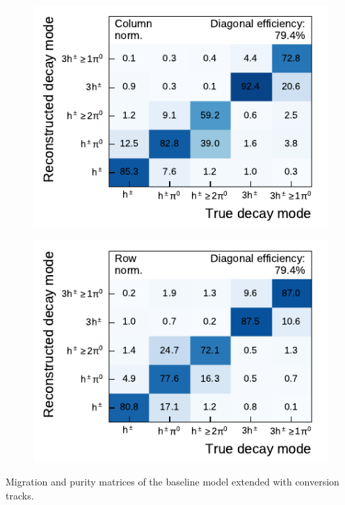 \noindent
\begin{minipage}{\textwidth}
  \captionsetup{type=figure}
  \begin{subfigure}[t]{0.48\textwidth}
    \centering
    \includegraphics{./figures/decay_mode_classification/experiments/mig_mat_conversions.pdf}
  \end{subfigure}\hfill
  \begin{subfigure}[t]{0.48\textwidth}
    \centering
    \includegraphics{./figures/decay_mode_classification/experiments/comp_mat_conversions.pdf}
  \end{subfigure}
  \caption{Migration and purity matrices of the baseline model extended with
    conversion tracks.}
\end{minipage}

\vfill

